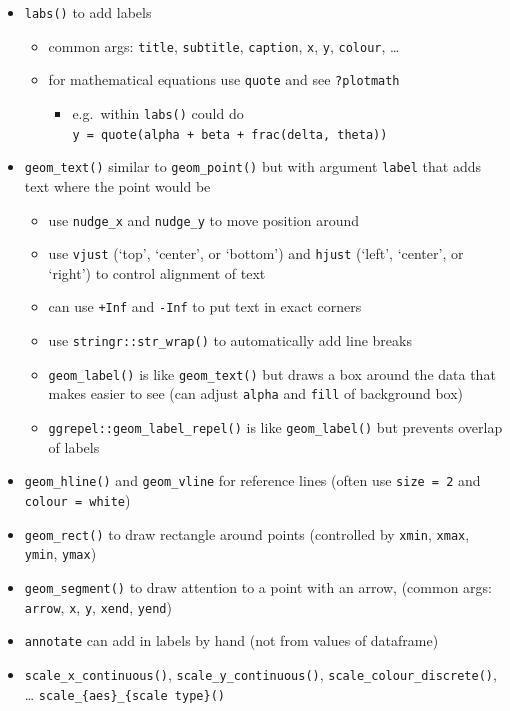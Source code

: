 \documentclass[]{book}
\providecommand{\tightlist}{%
  \setlength{\itemsep}{0pt}\setlength{\parskip}{0pt}}
\theoremstyle{definition}
\theoremstyle{definition}
\theoremstyle{definition}
\theoremstyle{remark}
\begin{document}
\begin{itemize}
\tightlist
\item
  \texttt{labs()} to add labels

  \begin{itemize}
  \tightlist
  \item
    common args: \texttt{title}, \texttt{subtitle}, \texttt{caption},
    \texttt{x}, \texttt{y}, \texttt{colour}, \ldots{}
  \item
    for mathematical equations use \texttt{quote} and see
    \texttt{?plotmath}

    \begin{itemize}
    \tightlist
    \item
      e.g.~within \texttt{labs()} could do
      \texttt{y\ =\ quote(alpha\ +\ beta\ +\ frac(delta,\ theta))}
    \end{itemize}
  \end{itemize}
\item
  \texttt{geom\_text()} similar to \texttt{geom\_point()} but with
  argument \texttt{label} that adds text where the point would be

  \begin{itemize}
  \tightlist
  \item
    use \texttt{nudge\_x} and \texttt{nudge\_y} to move position around
  \item
    use \texttt{vjust} (`top', `center', or `bottom') and \texttt{hjust}
    (`left', `center', or `right') to control alignment of text
  \item
    can use \texttt{+Inf} and \texttt{-Inf} to put text in exact corners
  \item
    use \texttt{stringr::str\_wrap()} to automatically add line breaks
  \item
    \texttt{geom\_label()} is like \texttt{geom\_text()} but draws a box
    around the data that makes easier to see (can adjust \texttt{alpha}
    and \texttt{fill} of background box)
  \item
    \texttt{ggrepel::geom\_label\_repel()} is like
    \texttt{geom\_label()} but prevents overlap of labels
  \end{itemize}
\item
  \texttt{geom\_hline()} and \texttt{geom\_vline} for reference lines
  (often use \texttt{size\ =\ 2} and \texttt{colour\ =\ white})
\item
  \texttt{geom\_rect()} to draw rectangle around points (controlled by
  \texttt{xmin}, \texttt{xmax}, \texttt{ymin}, \texttt{ymax})
\item
  \texttt{geom\_segment()} to draw attention to a point with an arrow,
  (common args: \texttt{arrow}, \texttt{x}, \texttt{y}, \texttt{xend},
  \texttt{yend})
\item
  \texttt{annotate} can add in labels by hand (not from values of
  dataframe)
\item
  \texttt{scale\_x\_continuous()}, \texttt{scale\_y\_continuous()},
  \texttt{scale\_colour\_discrete()}, \ldots{}
  \texttt{scale\_\{aes\}\_\{scale\ type\}()}


\end{itemize}
\end{document}
